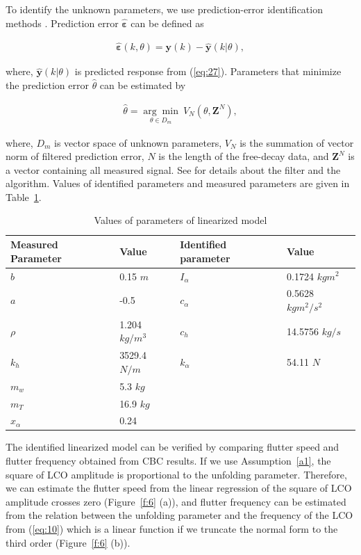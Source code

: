 \documentclass[openacc]{rsproca_new}%
\def\epsilon{\varepsilon}
\def\vec#1{\ensuremath{\mathbf{#1}}}
\newcommand{\Eref}[1]{(\ref{#1})}
\newcommand{\Fref}[1]{Figure~\ref{#1}}
\newcommand{\Tref}[1]{Table~\ref{#1}}
\newcommand{\asref}[1]{Assumption~\ref{#1}}
\begin{document}
\noindent To identify the unknown parameters, we use prediction-error identification methods \cite{ljung2001system}. Prediction error \vec{\hat \epsilon} can be defined as

\begin{align}\label{eq:2-9}
\vec{\hat \epsilon}(k,\theta)=\vec{y}(k)-\hat{\vec{y}}(k|\theta),
\end{align}

\noindent where, $\hat{\vec{y}}(k|\theta)$ is predicted response from \Eref{eq:27}. Parameters that minimize the prediction error $\hat \theta$ can be estimated by

\begin{align}\label{eq:2-10}
\hat{\theta}=\underset{\theta \in D_m}{\arg\min} \: V_N(\theta,\vec{Z}^N),
\end{align}

\noindent where, $D_m$ is vector space of unknown parameters, $V_N$ is the summation of vector norm of filtered prediction error, $N$ is the length of the free-decay data, and $\vec{Z}^N$ is a vector containing all measured signal. See \cite{ljung2001system} for details about the filter and the algorithm. Values of identified parameters and measured parameters are given in \Tref{t2}.

\begin{table}[!ht]
\caption{Values of parameters of linearized model}%
\label{t2}
\begin{tabular}{llll}%
\hline
Measured Parameter & Value & Identified parameter & Value \\
\hline
$b$ & 0.15  $m$ & $I_{\alpha}$ & 0.1724  $kgm^2$ \\
$a$ & -0.5 & $c_\alpha$ & 0.5628  $kgm^2/s^2$ \\
$\rho$ & 1.204  $kg/m^3$ & $c_h$  & 14.5756  $kg/s$ \\
$k_{h}$ & 3529.4  $N/m$ & $k_\alpha$ & 54.11  $N$ \\
$m_w$ & 5.3  $kg$ & & \\
$m_T$ &  16.9  $kg$ & &  \\
$x_\alpha$ & 0.24 & & \\
\hline
\end{tabular}
\vspace*{-4pt}
\end{table}%

\noindent The identified linearized model can be verified by comparing flutter speed and flutter frequency obtained from CBC results. If we use \asref{a1}, the square of LCO amplitude is proportional to the unfolding parameter. Therefore, we can estimate the flutter speed from the linear regression of the square of LCO amplitude crosses zero (\Fref{f:6} (a)), and flutter frequency can be estimated from the relation between the unfolding parameter and the frequency of the LCO from \Eref{eq:10} which is a linear function if we truncate the normal form to the third order (\Fref{f:6} (b)).
\end{document}
